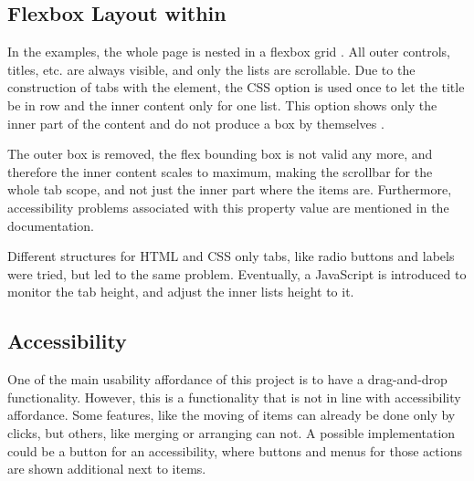 \subsection{Flexbox Layout within }

In the examples, the whole page is nested in a flexbox grid
\parencite{mdn-flexbox}. All outer controls, titles, etc. are always
visible, and only the lists are scrollable. Due to the construction of
tabs with the  element, the CSS option  is used once to let the title be in row and the inner content
only for one list. This option shows only the inner part of the content
and do not produce a box by themselves \parencite{mdn-display}.

The outer box is removed, the flex bounding box is not valid any more,
and therefore the inner content scales to maximum, making the scrollbar
for the whole tab scope, and not just the inner part where the items
are. Furthermore, accessibility problems associated with this property
value are mentioned in the documentation.

Different structures for HTML and CSS only tabs, like radio buttons and
labels \parencite{kliemann-radiotabs} were tried, but led to the same
problem. Eventually, a JavaScript 
\parencite{mdn-resizeobs} is introduced to monitor the tab height, and
adjust the inner lists height to it.



\subsection{Accessibility}

One of the main usability affordance of this project is to have a
drag-and-drop functionality. However, this is a functionality that is
not in line with accessibility affordance. Some features, like the
moving of items can already be done only by clicks, but others, like
merging or arranging can not. A possible implementation could be a
button for an accessibility, where buttons and menus for those actions
are shown additional next to items.

